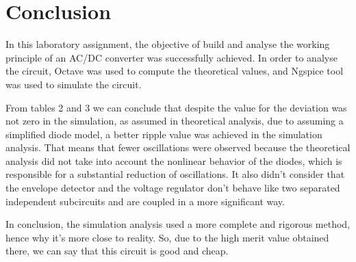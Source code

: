 \section{Conclusion}
\label{sec:conclusion}
In this laboratory assignment, the objective of build and analyse the working principle of an AC/DC converter was successfully achieved.
In order to analyse the circuit, Octave was used to compute the theoretical values, and Ngspice tool
was used to simulate the circuit.

From tables 2 and 3 we can conclude that despite the value for the deviation was not zero in the simulation, as assumed in theoretical analysis, due to assuming a simplified diode model, a better ripple value was achieved in the simulation analysis. That means that fewer oscillations were observed because the theoretical analysis did not take into account the nonlinear behavior of the diodes, which is responsible for a substantial reduction of oscillations. It also didn't consider that the envelope detector and the voltage regulator don't behave like two separated independent subcircuits and are coupled in a more significant way.

In conclusion, the simulation analysis used a more complete and rigorous method, hence why it's more close to reality. So, due to the high merit value obtained there, we can say that this circuit is good and cheap.


